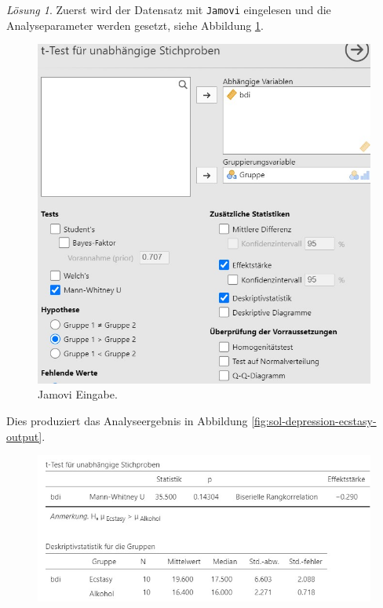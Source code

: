 \documentclass[
]{book}
\theoremstyle{definition}
\theoremstyle{definition}
\theoremstyle{definition}
\theoremstyle{definition}
\theoremstyle{remark}
\newtheorem*{solution}{Lösung}
\begin{document}
\begin{solution}

Zuerst wird der Datensatz mit \texttt{Jamovi} eingelesen und die
Analyseparameter werden gesetzt, siehe Abbildung
\ref{fig:sol-depression-ecstasy-input}.

\begin{figure}

{\centering \includegraphics[width=1\linewidth]{figures/07-exr-depression-ecstasy-jmv-input} 

}

\caption{Jamovi Eingabe.}\label{fig:sol-depression-ecstasy-input}
\end{figure}

Dies produziert das Analyseergebnis in Abbildung
\ref{fig:sol-depression-ecstasy-output}.

\begin{figure}

{\centering \includegraphics[width=1\linewidth]{figures/07-exr-depression-ecstasy-jmv-output} 

}
\end{figure}
\end{solution}
\end{document}
